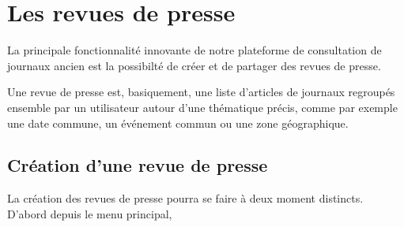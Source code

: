 \section{Les revues de presse}
\label{sec:revue}

La principale fonctionnalité innovante de notre plateforme de consultation de journaux ancien est la possibilté de
créer et de partager des revues de presse.

Une revue de presse est, basiquement, une liste d'articles de journaux regroupés ensemble par un utilisateur autour d'une thématique précis,
comme par exemple une date commune, un événement commun ou une zone géographique.

\subsection{Création d'une revue de presse}
\label{subsec:creation_revue}

La création des revues de presse pourra se faire à deux moment distincts. D'abord depuis le menu principal, 
